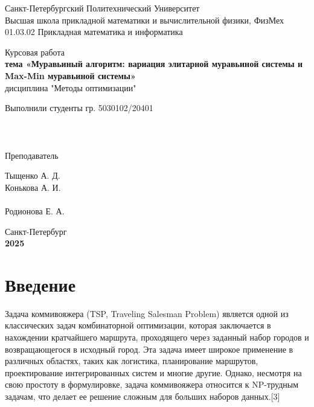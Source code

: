 \documentclass[14pt]{article}
\begin{document}
\thispagestyle{empty}
\begin{center}
\large
Санкт-Петербургский Политехнический Университет \\

Высшая школа прикладной математики и вычислительной физики, ФизМех \\

01.03.02 Прикладная математика и информатика
\end{center}

\vspace{4cm}

\begin{center}
\Large
Курсовая работа\\
\textbf{тема «Муравьиный алгоритм: вариация элитарной муравьиной системы и Max-Min муравьиной системы»}\\

дисциплина "Методы оптимизации"
\end{center}

\vspace{8cm}
\noindent%
\begin{minipage}[t]{.75\textwidth}
\Large
Выполнили студенты гр. 5030102/20401
\\
\\
\\
\\
Преподаватель
\end{minipage}%
\begin{minipage}[t]{.5\textwidth}
\Large
Тыщенко А. Д. \\
Конькова А. И. \\
\\
Родионова Е. А.
\end{minipage}%
\vspace{3cm}

\begin{center}
Санкт-Петербург\\
\textbf{2025}
\end{center}

\newpage
\renewcommand{\contentsname}{Содержание}
\tableofcontents


\newpage
\section{Введение}

Задача коммивояжера (TSP, Traveling Salesman Problem) является одной из классических задач комбинаторной оптимизации, которая заключается в нахождении кратчайшего маршрута, проходящего через заданный набор городов и возвращающегося в исходный город. Эта задача имеет широкое применение в различных областях, таких как логистика, планирование маршрутов, проектирование интегрированных систем и многие другие. Однако, несмотря на свою простоту в формулировке, задача коммивояжера относится к NP-трудным задачам, что делает ее решение сложным для больших наборов данных.[3]
\end{document}
